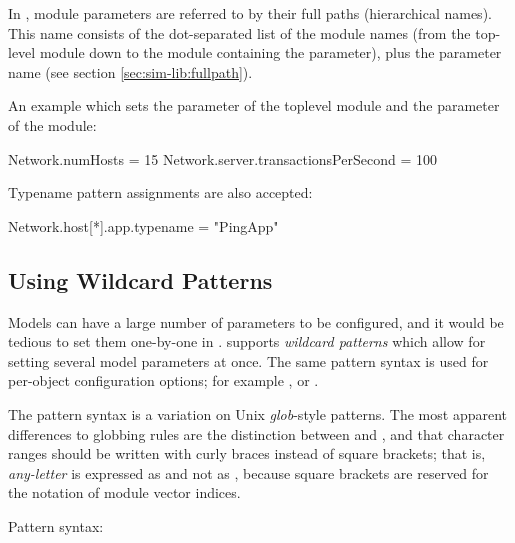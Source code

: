 In , module parameters are referred to by their full paths
(hierarchical names). This name consists of the dot-separated list of
the module names (from the top-level module down to the module containing
the parameter), plus the parameter name (see section \ref{sec:sim-lib:fullpath}).

An example  which sets the  parameter of
the toplevel module and the  parameter of the
 module:

\begin{inifile}
[General]
Network.numHosts = 15
Network.server.transactionsPerSecond = 100
\end{inifile}

Typename pattern assignments are also accepted:

\begin{inifile}
[General]
Network.host[*].app.typename = "PingApp"
\end{inifile}


\subsection{Using Wildcard Patterns}
\label{sec:config-sim:wildcards}

Models can have a large number of parameters to be configured, and it would
be tedious to set them one-by-one in . {\opp} supports
\textit{wildcard patterns} which allow for setting several model parameters
at once. The same pattern syntax is used for per-object configuration options;
for example , or .

The pattern syntax is a variation on Unix \textit{glob}-style
patterns. The most apparent differences to globbing rules are the
distinction between \ttt{*} and \ttt{**}, and that character ranges should
be written with curly braces instead of square brackets; that is,
\textit{any-letter} is expressed as  and not as
\ttt{[a-zA-Z]}, because square brackets are reserved for the notation of
module vector indices.

Pattern syntax:


